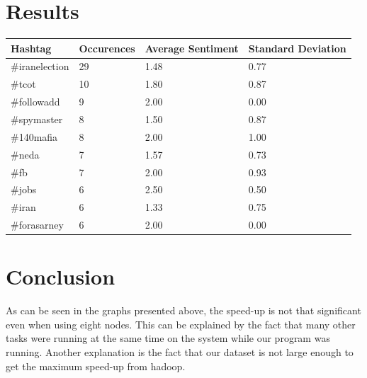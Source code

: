 \documentclass[a4paper,12px]{article}
\begin{document}
\section{Results}

\noindent\begin{tabularx}{\textwidth}{p{} p{} p{} p{}}
    Hashtag & Occurences & Average Sentiment & Standard Deviation \\
    \hline
    \#iranelection  & 29 & 1.48 & 0.77 \\
    \#tcot          & 10 & 1.80 & 0.87 \\
    \#followadd     & 9  & 2.00 & 0.00 \\
    \#spymaster     & 8  & 1.50 & 0.87 \\
    \#140mafia      & 8  & 2.00 & 1.00 \\
    \#neda          & 7  & 1.57 & 0.73 \\
    \#fb            & 7  & 2.00 & 0.93 \\
    \#jobs          & 6  & 2.50 & 0.50 \\
    \#iran          & 6  & 1.33 & 0.75 \\
    \#forasarney    & 6  & 2.00 & 0.00 \\
\end{tabularx}

\section{Conclusion}

As can be seen in the graphs presented above, the speed-up is not that
significant even when using eight nodes. This can be explained by the fact that
many other tasks were running at the same time on the system while our program
was running. Another explanation is the fact that our dataset is not large
enough to get the maximum speed-up from hadoop.



%
%
\end{document}
